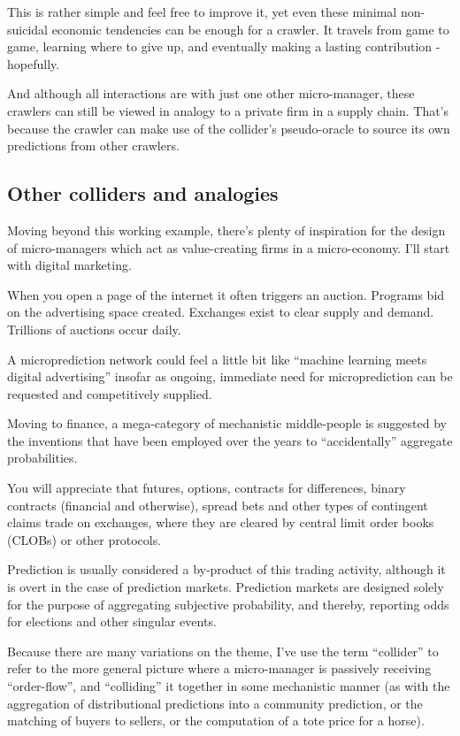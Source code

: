 This is rather simple and feel free to improve it, yet even these minimal non-suicidal economic tendencies can be enough for a crawler. It travels from game to game, learning where to give up, and eventually making a lasting contribution - hopefully.  

And although all interactions are with just one other micro-manager, these crawlers can still be viewed in analogy to a private firm in a supply chain. That's because the crawler can make use of the collider's pseudo-oracle to source its own predictions from other crawlers. 


\subsection{Other colliders and analogies}

Moving beyond this working example, there's plenty of inspiration for the design of micro-managers which act as value-creating firms in a micro-economy. I'll start with digital marketing. 

When you open a page of the internet it often triggers an auction. Programs bid on the advertising space created. Exchanges exist to clear supply and demand. Trillions of auctions occur daily. 

A microprediction network could feel a little bit like ``machine learning meets digital advertising'' insofar as ongoing, immediate need for microprediction can be requested and competitively supplied. 

Moving to finance, a mega-category of mechanistic middle-people is suggested by the inventions that have been employed over the years to ``accidentally'' aggregate probabilities. 

You will appreciate that futures, options, contracts for differences, binary contracts (financial and otherwise), spread bets and other types of contingent claims trade on exchanges, where they are cleared by central limit order books (CLOBs) or other protocols.

Prediction is usually considered a by-product of this trading activity, although it is overt in the case of prediction markets. Prediction markets are designed solely for the purpose of aggregating subjective probability, and thereby, reporting odds for elections and other singular events. 

Because there are many variations on the theme, I've use the term ``collider'' to refer to the more general picture where a micro-manager is passively receiving ``order-flow'', and ``colliding'' it together in some mechanistic manner (as with the aggregation of distributional predictions into a community prediction, or the matching of buyers to sellers, or the computation of a tote price for a horse). 

